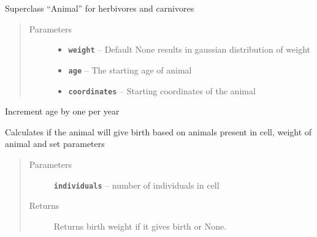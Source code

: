 \documentclass[a4paper,10pt,openany,oneside]{sphinxmanual}
\begin{document}
\begin{fulllineitems}
\label{animals:biosim.animals.Animal}
Superclass ``Animal'' for herbivores and carnivores
\begin{quote}\begin{description}
\item[{Parameters}] \leavevmode\begin{itemize}
\item {} 
\textbf{\texttt{weight}} -- Default None results in gaussian distribution of weight

\item {} 
\textbf{\texttt{age}} -- The starting age of animal

\item {} 
\textbf{\texttt{coordinates}} -- Starting coordinates of the animal

\end{itemize}

\end{description}\end{quote}

\begin{fulllineitems}
\label{animals:biosim.animals.Animal.ageing}
Increment age by one per year

\end{fulllineitems}


\begin{fulllineitems}
\label{animals:biosim.animals.Animal.breeding}
Calculates if the animal will give birth based on animals present in
cell, weight of animal and set parameters
\begin{quote}\begin{description}
\item[{Parameters}] \leavevmode
\textbf{\texttt{individuals}} -- number of individuals in cell

\item[{Returns}] \leavevmode
Returns birth weight if it gives birth or None.

\end{description}\end{quote}


\end{fulllineitems}
\end{fulllineitems}
\end{document}
